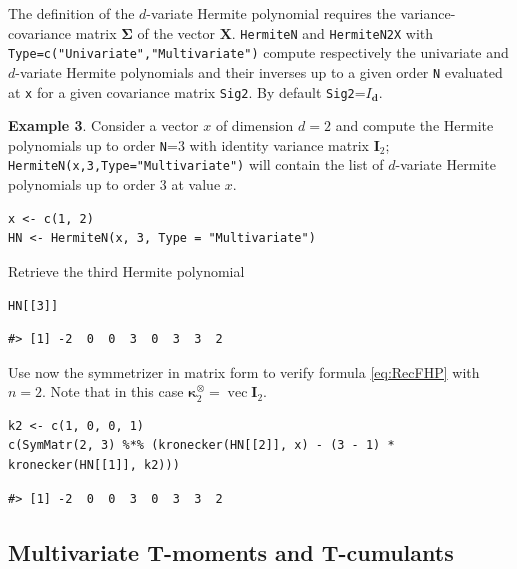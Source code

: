 The definition of the \(d\)-variate Hermite polynomial requires the variance-covariance matrix \(\mathbf{\Sigma}\) of the vector \(\mathbf{X}\). \texttt{HermiteN} and \texttt{HermiteN2X} with \texttt{Type=c("Univariate","Multivariate")} compute respectively the univariate and \(d\)-variate Hermite polynomials and their inverses up to a given order \texttt{N} evaluated at \texttt{x} for a given covariance matrix \texttt{Sig2}. By default \texttt{Sig2}=\(I_\mathbf{d}\).

\textbf{Example 3}. Consider a vector \(x\) of dimension \(d=2\) and compute the Hermite polynomials up to order \texttt{N}=\(3\) with identity variance matrix \(\mathbf{I}_2\); \texttt{HermiteN(x,3,Type="Multivariate")} will contain the list of \(d\)-variate Hermite polynomials up to order \(3\) at value \(x\).

\begin{verbatim}
x <- c(1, 2)
HN <- HermiteN(x, 3, Type = "Multivariate")
\end{verbatim}

Retrieve the third Hermite polynomial

\begin{verbatim}
HN[[3]]
\end{verbatim}

\begin{verbatim}
#> [1] -2  0  0  3  0  3  3  2
\end{verbatim}

Use now the symmetrizer in matrix form to verify formula \eqref{eq:RecFHP} with \(n=2\). Note that in this case \(\boldsymbol{\kappa}_2^{\otimes}=\operatorname{vec}\mathbf{I}_2\).

\begin{verbatim}
k2 <- c(1, 0, 0, 1)
c(SymMatr(2, 3) %*% (kronecker(HN[[2]], x) - (3 - 1) * kronecker(HN[[1]], k2)))
\end{verbatim}

\begin{verbatim}
#> [1] -2  0  0  3  0  3  3  2
\end{verbatim}

\hypertarget{multivariate-t-moments-and-t-cumulants}{%
\subsection{Multivariate T-moments and T-cumulants}\label{multivariate-t-moments-and-t-cumulants}}

